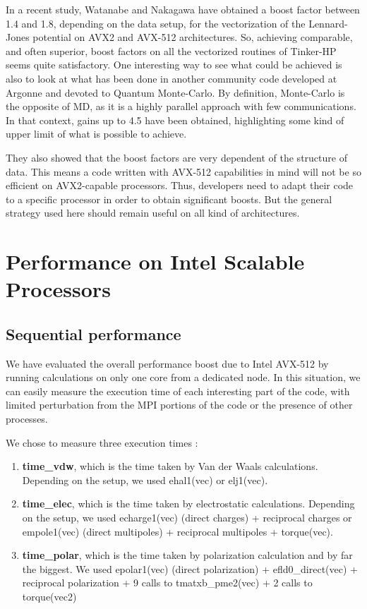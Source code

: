 \documentclass[9pt,comparison]{livecoms}
\begin{document}
In a recent study, Watanabe and Nakagawa\cite{VectorizationLJ} have obtained a boost factor between 1.4 and 1.8, depending on the data setup, for the vectorization of the Lennard-Jones potential on AVX2 and AVX-512 architectures. So, achieving comparable, and often superior, boost factors on all the vectorized routines of Tinker-HP seems quite satisfactory. One interesting way to see what could be achieved is also to look at what has been done in another community code developed at Argonne and devoted to Quantum  Monte-Carlo\cite{QMCpackavx}. By definition, Monte-Carlo is the opposite of MD, as it is a highly parallel approach with few communications. In that context,  gains up to 4.5 have been obtained, highlighting some kind of upper limit of what is possible to achieve.

They also showed that the boost factors are very dependent of the structure of data. This means a code written with AVX-512 capabilities in mind will not be so efficient on AVX2-capable processors. Thus, developers need to adapt their code to a specific processor in order to obtain significant boosts. But the general strategy used here should remain useful on all kind of architectures.

\section{Performance on Intel Scalable Processors}

\subsection{Sequential performance}
\hspace{\parindent}We have evaluated the overall performance boost due to Intel AVX-512 by running calculations on only one core from a dedicated node. In this situation, we can easily measure the execution time of each interesting part of the code, with limited perturbation from the MPI portions of the code or the presence of other processes.

We chose to measure three execution times :
\begin{enumerate}
    \item \textbf{time\_vdw}, which is the time taken by Van der Waals calculations. Depending on the setup, we used  {\color{codepurple} ehal1(vec)} or {\color{codepurple} elj1(vec)}.
    \item \textbf{time\_elec}, which is the time taken by electrostatic calculations. Depending on the setup, we used {\color{codepurple}echarge1(vec)} (direct charges) + reciprocal charges or {\color{codepurple}empole1(vec)} (direct multipoles) + reciprocal multipoles + {\color{codepurple} torque(vec)}.
    \item \textbf{time\_polar}, which is the time taken by polarization calculation and by far the biggest. We used {\color{codepurple} epolar1(vec)} (direct polarization)  + {\color{codepurple}efld0\_direct(vec)} + reciprocal polarization + 9 calls to {\color{codepurple}tmatxb\_pme2(vec)} + 2 calls to {\color{codepurple}torque(vec2)}
\end{enumerate}
\end{document}
